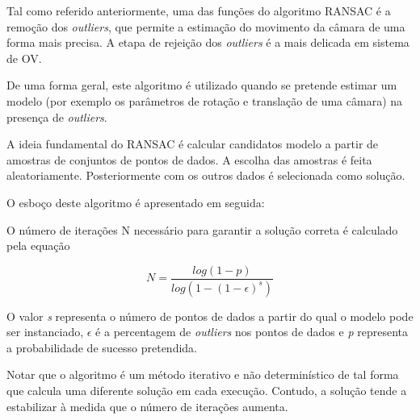Tal como referido anteriormente, uma das funções do algoritmo RANSAC é a remoção dos \textit{outliers}, que permite a estimação do movimento da câmara de uma forma mais precisa. A etapa de rejeição dos \textit{outliers} é a mais delicada em sistema de OV.

De uma forma geral, este algoritmo é utilizado quando se pretende estimar um modelo (por exemplo os parâmetros de rotação e translação de uma câmara) na presença de \textit{outliers}.

A ideia fundamental do RANSAC é calcular candidatos modelo a partir de amostras de conjuntos de pontos de dados. A escolha das amostras é feita aleatoriamente. Posteriormente com os outros dados é selecionada como solução.

O esboço deste algoritmo é apresentado em seguida:


O número de iterações N necessário para garantir a solução correta é calculado pela equação

\[  N = \frac{log(1-p)}{log(1-(1-\epsilon)^s)} \]

O valor \textit{s} representa o número de pontos de dados a partir do qual o modelo pode ser instanciado, $\epsilon$ é a percentagem de \textit{outliers} nos pontos de dados e \textit{p} representa a probabilidade de sucesso pretendida.

Notar que o algoritmo é um método iterativo e não determinístico de tal forma que calcula uma diferente solução em cada execução. Contudo, a solução tende a estabilizar à medida que o número de iterações aumenta.